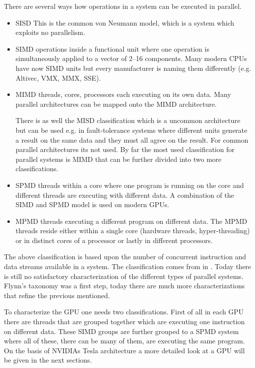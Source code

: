 There are several ways how operations in a system can be executed in parallel. 
\begin{itemize}
	\item \gls{SISD} This is the common von Neumann model, which is a system which
	exploits no parallelism.
	\item \gls{SIMD} operations inside a functional unit where one operation is 
	simultaneously applied to a vector of 2--16 components. Many modern \glspl{CPU}
	have now \gls{SIMD} units but every manufacturer is naming them differently
(e.g. Altivec, \gls{VMX}, \gls{MMX}, \gls{SSE}).
	\item \gls{MIMD} threads, cores, processors each executing on its own data. Many
	parallel architectures can be mapped onto the \gls{MIMD} architecture. 
	
	There is as well the \gls{MISD} classification which is a uncommon architecture but
	can be used e.g. in fault-tolerance systems where different units generate a result 
	on the same data and they must all agree on the result. For common parallel architectures
	its not used. By far the most used classification for parallel systems is \gls{MIMD}
	that can be further divided into two more classifications. 
	
	\item \gls{SPMD} threads within a core where one program is running on the core
	and different threads are executing with different data. A combination of the 
	\gls{SIMD} and \gls{SPMD} model is used on modern \glspl{GPU}.
	\item \gls{MPMD} threads executing a different program on different data. The 
	\gls{MPMD} threads reside either within a single core (hardware threads,
	hyper-threading) or in distinct cores of a processor or lastly in different
	processors.
\end{itemize}
The above classification is based upon the number of concurrent instruction and 
data streams available in a system. The classification comes from \citeauthor{citeulike:3789408}
in \citep{citeulike:3789408}. Today there is  still no satisfactory characterization 
of the different types of parallel systems. Flynn's taxonomy was a first step, 
today there are much more characterizations that refine the previous mentioned. 

To characterize the \gls{GPU} one needs two classifications. First of all in
each \gls{GPU} there are threads that are grouped together which are executing 
one instruction on different data. These \gls{SIMD} groups are further grouped
to a \gls{SPMD} system where all of these, there can be many of them, are
executing the same program. On the basis of \glspl{NVIDIA} Tesla architecture 
a more detailed look at a \gls{GPU} will be given in the next sections.


